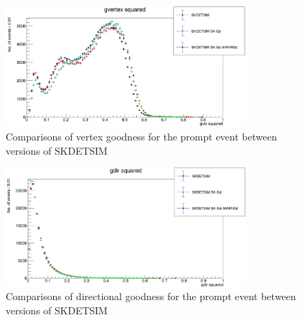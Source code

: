 \begin{figure}[htp]
    \centering
    \includegraphics[width=0.8\textwidth]{Figures/gvtx_squared.PNG}
    \caption{Comparisons of vertex goodness for the prompt event between versions of SKDETSIM}
    \label{fig:gvtx_squared}

\end{figure}

\begin{figure}[htp]
    \centering
    \includegraphics[width=0.8\textwidth]{Figures/gdir_squared.PNG}
    \caption{Comparisons of directional goodness for the prompt event between versions of SKDETSIM}
    \label{fig:gdir_squared}

\end{figure}

